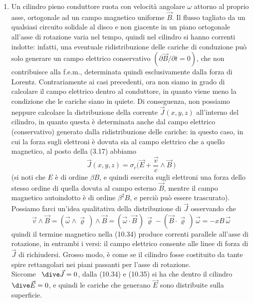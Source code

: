 \begin{enumerate}
  \item Un cilindro pieno conduttore ruota con velocit\`a angolare $\omega$
    attorno al proprio asse, ortogonale ad un campo magnetico uniforme $\vec B$.
    Il flusso tagliato da un qualsiasi circuito solidale al disco e non giacente
    in un piano ortogonale all'asse di rotazione varia nel tempo, quindi nel
    cilindro si hanno correnti indotte: infatti, una eventuale ridistribuzione
    delle cariche di conduzione pu\`o solo generare un campo elettrico
    conservativo $(\partial\vec B/\partial t=0)$, che non contribuisce alla
    f.e.m., determinata quindi esclusivamente dalla forza di Lorentz.
    Contrariamente ai casi precedenti, ora non siamo in grado di calcolare il
    campo elettrico dentro al conduttore, in quanto viene meno la condizione che
    le cariche siano in quiete. Di conseguenza, non possiamo neppure calcolare
    la distribuzione della corrente $\vec J(x,y,z)$ all'interno del cilindro, in
    quanto questa \`e determinata anche dal campo elettrico (conservativo)
    generato dalla ridistribuzione delle cariche: in questo caso, in cui la
    forza sugli elettroni \`e dovuta sia al campo elettrico che a quello
    magnetico, al posto della (3.17) abbiamo
    \begin{equation}
      \vec J(x,y,z)=\sigma_c\big(\vec E+\frac{\vec v}{c}\wedge\vec B\,\big)
      \tag{10.34}
    \end{equation}
    (si noti che $E$ \`e di ordine $\beta B$, e quindi esercita sugli elettroni
    una forza dello stesso ordine di quella dovuta al campo esterno $\vec B$,
    mentre il campo magnetico autoindotto \`e di ordine $\beta^2B$, e perci\`o
    pu\`o essere trascurato). Possiamo farci un'idea qualitativa della
    distribuzione di $\vec J$ osservando che
    \begin{equation}
      \vec v\wedge\vec B=(\vec\omega\wedge\vec\varrho\,)\wedge\vec B
      =(\vec\omega\cdot\vec B\,)\,\vec\varrho
      -(\vec B\cdot\vec\varrho\,)\,\vec\omega=-xB\,\vec\omega
      \tag{10.35}
    \end{equation}
    quindi il termine magnetico nella (10.34) produce correnti parallele
    all'asse di rotazione, in entrambi i versi: il campo elettrico consente alle
    linee di forza di $\vec J$
    di richiudersi. Grosso modo, \`e come se il cilindro fosse costituito da
    tante spire rettangolari nei piani passanti per l'asse di rotazione.\\
    Siccome \ $\dive\vec J=0$, dalla (10.34) e (10.35) si ha che dentro il
    cilindro \ $\dive\vec E=0$, e quindi le cariche che generano $\vec E$ sono
    distribuite sulla superficie.
\end{enumerate}

